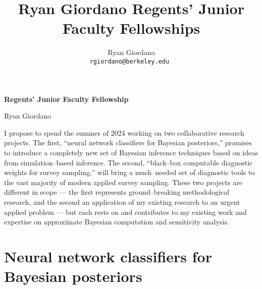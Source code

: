 
\usepackage{enumitem}

\usepackage{geometry}
\geometry{top=1.0in}
\geometry{left=1.1in}
\geometry{right=1.1in}

\title{Ryan Giordano Regents’ Junior Faculty Fellowships}

\author{
  Ryan Giordano \\ \texttt{rgiordano@berkeley.edu }
}



\begin{minipage}[t]{0.7\textwidth}
\hspace{-2em} %
{\bf \LARGE Regents’ Junior Faculty Fellowship}\\
\end{minipage}
\begin{minipage}[t]{0.3\textwidth}
        {\LARGE Ryan Giordano}
\end{minipage}

I propose to spend the summer of 2024 working on two collaborative research
projects.  The first, ``neural network classifiers for Bayesian posteriors,''
promises to introduce a completely new set of Bayesian inference techniques
based on ideas from simulation--based inference. The second, ``black--box
computable diagnostic weights for survey sampling,'' will bring a much--needed
set of diagnostic tools to the vast majority of modern applied survey sampling.
These two projects are different in scope --- the first represents
ground--breaking methodological research, and the second an application of my
existing research to an urgent applied problem --- but each rests on and
contributes to my existing work and expertise on approximate Bayesian
computation and sensitivity analysis. 





\section*{Neural network classifiers for Bayesian posteriors}

